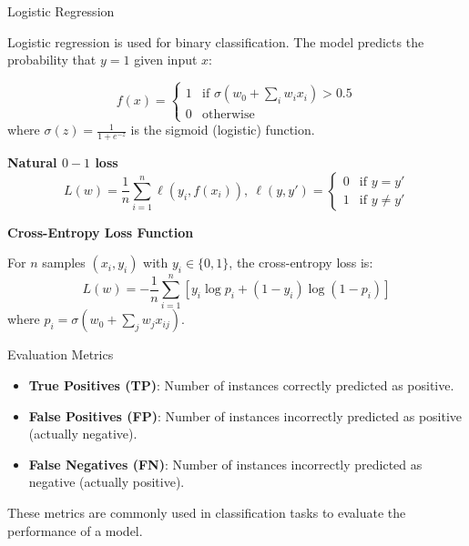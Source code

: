 \documentclass{beamer}
\begin{document}
\begin{frame}{Logistic Regression}

Logistic regression is used for binary classification. The model predicts the probability that $y=1$ given input $x$:

\[
f(x) = 
\begin{cases}
1 & \text{if } \sigma(w_0 + \sum_i w_i x_i) > 0.5 \\
0 & \text{otherwise}
\end{cases}
\]
where $\sigma(z) = \frac{1}{1 + e^{-z}}$ is the sigmoid (logistic) function.

\textbf{Natural $0-1$ loss}
\[
   L(w)=\frac{1}{n} \sum_{i=1}^n \ell(y_i, f(x_i)), ~ \ell(y, y') =
   \begin{cases}
   0 & \text{if } y = y' \\
   1 & \text{if } y \neq y'
   \end{cases}
\]

\textbf{Cross-Entropy Loss Function}

For $n$ samples $(x_i, y_i)$ with $y_i \in \{0,1\}$, the cross-entropy loss is:
\[
L(w) = -\frac{1}{n} \sum_{i=1}^n \left[ y_i \log p_i + (1 - y_i) \log (1 - p_i) \right]
\]
where $p_i = \sigma(w_0 + \sum_j w_j x_{ij})$.

\end{frame}
\begin{frame}{Evaluation Metrics}
    \begin{itemize}
        \item \textbf{True Positives (TP)}: Number of instances correctly predicted as positive.
        \item \textbf{False Positives (FP)}: Number of instances incorrectly predicted as positive (actually negative).
        \item \textbf{False Negatives (FN)}: Number of instances incorrectly predicted as negative (actually positive).
    \end{itemize}

    These metrics are commonly used in classification tasks to evaluate the performance of a model.

\end{frame}
\end{document}
